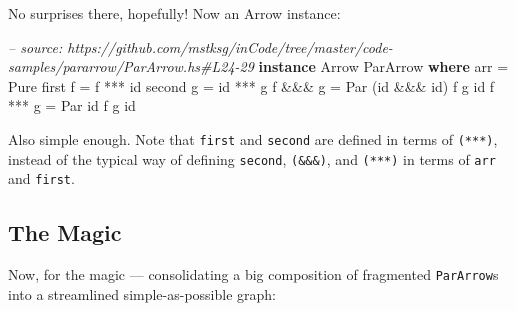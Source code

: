 \documentclass[]{article}
\newenvironment{Shaded}{}{}
\newcommand{\KeywordTok}[1]{\textcolor[rgb]{0.00,0.44,0.13}{\textbf{#1}}}
\newcommand{\DataTypeTok}[1]{\textcolor[rgb]{0.56,0.13,0.00}{#1}}
\newcommand{\CommentTok}[1]{\textcolor[rgb]{0.38,0.63,0.69}{\textit{#1}}}
\newcommand{\FunctionTok}[1]{\textcolor[rgb]{0.02,0.16,0.49}{#1}}
\newcommand{\NormalTok}[1]{#1}
\begin{document}
No surprises there, hopefully! Now an Arrow instance:

\begin{Shaded}
\begin{Highlighting}[]
\CommentTok{-- source: https://github.com/mstksg/inCode/tree/master/code-samples/pararrow/ParArrow.hs#L24-29}
\KeywordTok{instance} \DataTypeTok{Arrow} \DataTypeTok{ParArrow} \KeywordTok{where}
\NormalTok{    arr      }\FunctionTok{=} \DataTypeTok{Pure}
\NormalTok{    first f  }\FunctionTok{=}\NormalTok{ f  }\FunctionTok{***}\NormalTok{ id}
\NormalTok{    second g }\FunctionTok{=}\NormalTok{ id }\FunctionTok{***}\NormalTok{ g}
\NormalTok{    f }\FunctionTok{&&&}\NormalTok{ g  }\FunctionTok{=} \DataTypeTok{Par}\NormalTok{ (id }\FunctionTok{&&&}\NormalTok{ id) f g id}
\NormalTok{    f }\FunctionTok{***}\NormalTok{ g  }\FunctionTok{=} \DataTypeTok{Par}\NormalTok{ id          f g id}
\end{Highlighting}
\end{Shaded}

Also simple enough. Note that \texttt{first} and \texttt{second} are defined in
terms of \texttt{(***)}, instead of the typical way of defining \texttt{second},
\texttt{(\&\&\&)}, and \texttt{(***)} in terms of \texttt{arr} and
\texttt{first}.

\subsection{The Magic}\label{the-magic}

Now, for the magic --- consolidating a big composition of fragmented
\texttt{ParArrow}s into a streamlined simple-as-possible graph:
\end{document}
